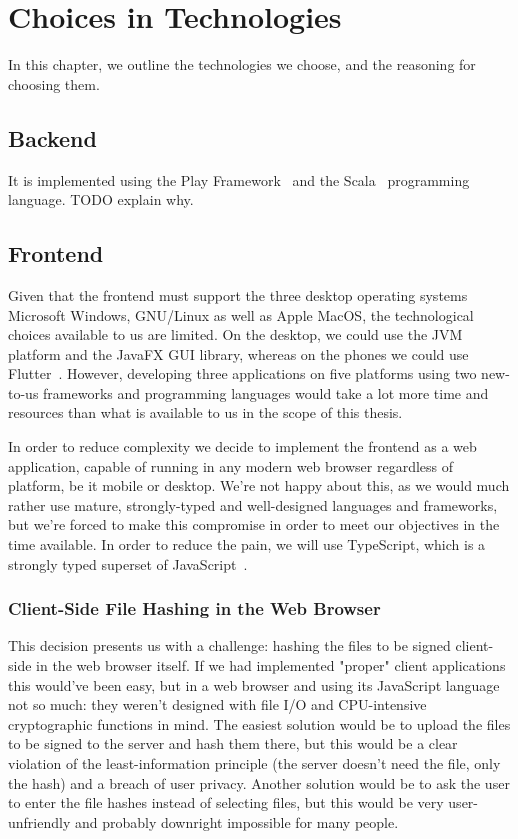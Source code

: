 \chapter{Choices in Technologies}
\label{ch:techchoices}
In this chapter, we outline the technologies we choose, and the reasoning for choosing them.

\section{Backend}
\label{sec:techbackend}
It is implemented using the Play Framework~\cite{playframework} and the Scala~\cite{scalalang} programming language.
TODO explain why.

\section{Frontend}
\label{sec:techfrontend}

Given that the frontend must support the three desktop operating systems Microsoft Windows, GNU/Linux as well as Apple MacOS,
the technological choices available to us are limited.
On the desktop, we could use the \gls{JVM} platform and the JavaFX \gls{GUI} library, whereas on the phones
we could use Flutter~\cite{flutterframework}.
However, developing three applications on five platforms using two new-to-us frameworks and programming languages
would take a lot more time and resources than what is available to us in the scope of this thesis.

In order to reduce complexity we decide to implement the frontend as a web application, capable of running
in any modern web browser regardless of platform, be it mobile or desktop.
We're not happy about this, as we would much rather use mature, strongly-typed and well-designed languages and frameworks,
but we're forced to make this compromise in order to meet our objectives in the time available.
In order to reduce the pain, we will use TypeScript, which is a strongly typed superset of JavaScript~\cite{loltypes}.

\subsection{Client-Side File Hashing in the Web Browser}
\label{subsec:browserhashing}
This decision presents us with a challenge: hashing the files to be signed client-side in the web browser itself.
If we had implemented "proper" client applications this would've been easy, but in a web browser and using its
JavaScript language not so much: they weren't designed with file I/O and CPU-intensive cryptographic functions in mind.
The easiest solution would be to upload the files to be signed to the server and hash them there,
but this would be a clear violation of the least-information principle (the server doesn't need the file, only the hash)
and a breach of user privacy.
Another solution would be to ask the user to enter the file hashes instead of selecting files,
but this would be very user-unfriendly and probably downright impossible for many people.

